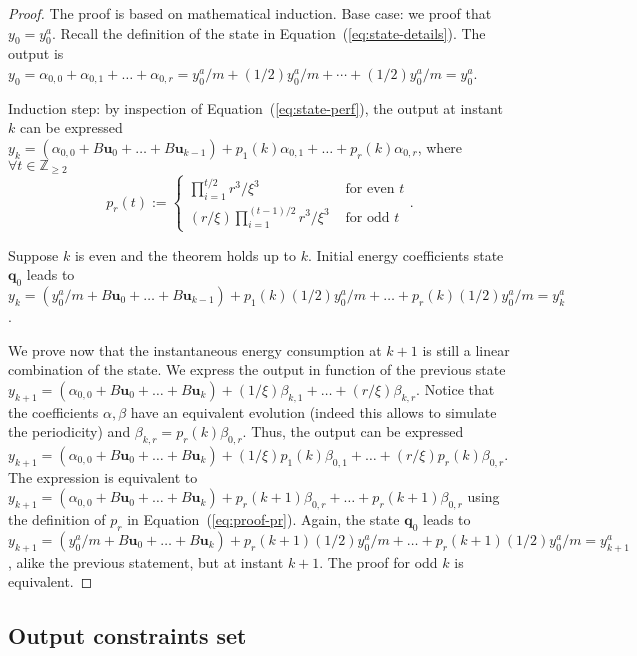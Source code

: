 \documentclass[letterpaper,10pt,conference]{ieeeconf}
\theoremstyle{definition}
\begin{document}
\begin{proof}
  The proof is based on mathematical induction. 
  Base case: we proof that $y_0=y_0^a$. Recall the definition of the state in Equation~(\ref{eq:state-details}). The output is $y_{0}=\alpha_{0,0}+\alpha_{0,1}+\dots+\alpha_{0,r}=y_0^a/m+(1/2)y_0^a/m+\cdots+(1/2)y_0^a/m=y_0^a$.
  
  Induction step: by inspection of Equation~(\ref{eq:state-perf}), the output at instant $k$ can be expressed $y_{k}=(\alpha_{0,0}+B\mathbf{u}_0+\dots+B\mathbf{u}_{k-1})+p_1(k)\alpha_{0,1}+\dots+p_r(k)\alpha_{0,r}$, where $\forall t\in\mathbb{Z}_{\geq 2}$
  \begin{equation}\label{eq:proof-pr}
    p_r(t):=\begin{cases}
      \prod_{i=1}^{t/2}{r^3/\xi^3}&\text{ for even }t\\
      (r/\xi)\prod_{i=1}^{(t-1)/2}{r^3/\xi^3}&\text{ for odd }t
    \end{cases}.
  \end{equation}
  
  Suppose $k$ is even and the theorem holds up to $k$. Initial energy coefficients state $\mathbf{q}_0$ leads to $y_{k}=(y_0^a/m+B\mathbf{u}_0+\dots+B\mathbf{u}_{k-1})+p_1(k)(1/2)y_0^a/m+\dots+p_r(k)(1/2)y_0^a/m=y_{k}^a$. 
  
  We prove now that the instantaneous energy consumption at $k+1$ is still a linear combination of the state. We express the output in function of the previous state $y_{k+1}=(\alpha_{0,0}+B\mathbf{u}_0+\dots+B\mathbf{u}_{k})+(1/\xi)\beta_{k,1}+\dots+(r/\xi)\beta_{k,r}$. Notice that the coefficients $\alpha,\beta$ have an equivalent evolution (indeed this allows to simulate the periodicity) and $\beta_{k,r}=p_r(k)\beta_{0,r}$. Thus, the output can be expressed $y_{k+1}=(\alpha_{0,0}+B\mathbf{u}_0+\dots+B\mathbf{u}_{k})+(1/\xi)p_1(k)\beta_{0,1}+\dots+(r/\xi)p_r(k)\beta_{0,r}$. The expression is equivalent to $y_{k+1}=(\alpha_{0,0}+B\mathbf{u}_0+\dots+B\mathbf{u}_{k})+p_r(k+1)\beta_{0,r}+\dots+p_r(k+1)\beta_{0,r}$ using the definition of $p_r$ in Equation~(\ref{eq:proof-pr}). Again, the state $\mathbf{q}_0$ leads to $y_{k+1}=(y_0^a/m+B\mathbf{u}_0+\dots+B\mathbf{u}_{k})+p_r(k+1)(1/2)y_0^a/m+\dots+p_r(k+1)(1/2)y_0^a/m=y_{k+1}^a$, alike the previous statement, but at instant $k+1$. The proof for odd $k$ is equivalent.
\end{proof}

\subsection{Output constraints set}
\end{document}
